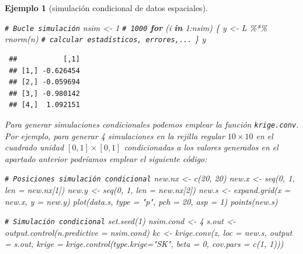\documentclass[
  10pt,
]{book}
\newenvironment{Shaded}{\begin{snugshade}}{\end{snugshade}}
\newcommand{\AttributeTok}[1]{\textcolor[rgb]{0.77,0.63,0.00}{#1}}
\newcommand{\CommentTok}[1]{\textcolor[rgb]{0.56,0.35,0.01}{\textit{#1}}}
\newcommand{\ControlFlowTok}[1]{\textcolor[rgb]{0.13,0.29,0.53}{\textbf{#1}}}
\newcommand{\DecValTok}[1]{\textcolor[rgb]{0.00,0.00,0.81}{#1}}
\newcommand{\FunctionTok}[1]{\textcolor[rgb]{0.00,0.00,0.00}{#1}}
\newcommand{\NormalTok}[1]{#1}
\newcommand{\OtherTok}[1]{\textcolor[rgb]{0.56,0.35,0.01}{#1}}
\newcommand{\SpecialCharTok}[1]{\textcolor[rgb]{0.00,0.00,0.00}{#1}}
\newcommand{\StringTok}[1]{\textcolor[rgb]{0.31,0.60,0.02}{#1}}
\theoremstyle{break}
\newtheorem{example}{Ejemplo}[chapter]
\theoremstyle{nonumberplain}
\renewcommand{\CommentTok}[1]{\textcolor[rgb]{0.41,0.41,0.41}{\texttt{#1}}}
\begin{document}
\begin{example}[simulación condicional de datos espaciales]
\begin{Shaded}
\begin{Highlighting}[]
\CommentTok{\# Bucle simulación}
\NormalTok{nsim }\OtherTok{\textless{}{-}} \DecValTok{1} \CommentTok{\# 1000}
\ControlFlowTok{for}\NormalTok{ (i }\ControlFlowTok{in} \DecValTok{1}\SpecialCharTok{:}\NormalTok{nsim) \{}
\NormalTok{  y }\OtherTok{\textless{}{-}}\NormalTok{ L }\SpecialCharTok{\%*\%} \FunctionTok{rnorm}\NormalTok{(n)}
  \CommentTok{\# calcular estadísticos, errores,...}
\NormalTok{\}}
\NormalTok{y}
\end{Highlighting}
\end{Shaded}

\begin{verbatim}
 ##           [,1]
 ## [1,] -0.626454
 ## [2,] -0.059694
 ## [3,] -0.980142
 ## [4,]  1.092151
\end{verbatim}

Para generar simulaciones condicionales podemos emplear la función \texttt{krige.conv}.
Por ejemplo, para generar 4 simulaciones en la rejilla regular \(10\times10\) en el cuadrado unidad \([0,1] \times [0,1]\) condicionadas a los valores generados en el apartado anterior podríamos emplear el siguiente código:

\begin{Shaded}
\begin{Highlighting}[]
\CommentTok{\# Posiciones simulación condicional}
\NormalTok{new.nx }\OtherTok{\textless{}{-}} \FunctionTok{c}\NormalTok{(}\DecValTok{20}\NormalTok{, }\DecValTok{20}\NormalTok{)}
\NormalTok{new.x }\OtherTok{\textless{}{-}} \FunctionTok{seq}\NormalTok{(}\DecValTok{0}\NormalTok{, }\DecValTok{1}\NormalTok{, }\AttributeTok{len =}\NormalTok{ new.nx[}\DecValTok{1}\NormalTok{])}
\NormalTok{new.y }\OtherTok{\textless{}{-}} \FunctionTok{seq}\NormalTok{(}\DecValTok{0}\NormalTok{, }\DecValTok{1}\NormalTok{, }\AttributeTok{len =}\NormalTok{ new.nx[}\DecValTok{2}\NormalTok{])}
\NormalTok{new.s }\OtherTok{\textless{}{-}} \FunctionTok{expand.grid}\NormalTok{(}\AttributeTok{x =}\NormalTok{ new.x, }\AttributeTok{y =}\NormalTok{ new.y)}
\FunctionTok{plot}\NormalTok{(data.s, }\AttributeTok{type =} \StringTok{"p"}\NormalTok{, }\AttributeTok{pch =} \DecValTok{20}\NormalTok{, }\AttributeTok{asp =} \DecValTok{1}\NormalTok{)}
\FunctionTok{points}\NormalTok{(new.s)}

\CommentTok{\# Simulación condicional}
\FunctionTok{set.seed}\NormalTok{(}\DecValTok{1}\NormalTok{)}
\NormalTok{nsim.cond }\OtherTok{\textless{}{-}} \DecValTok{4}
\NormalTok{s.out }\OtherTok{\textless{}{-}} \FunctionTok{output.control}\NormalTok{(}\AttributeTok{n.predictive =}\NormalTok{ nsim.cond)}
\NormalTok{kc }\OtherTok{\textless{}{-}} \FunctionTok{krige.conv}\NormalTok{(z, }\AttributeTok{loc =}\NormalTok{ new.s, }\AttributeTok{output =}\NormalTok{ s.out,}
            \AttributeTok{krige =} \FunctionTok{krige.control}\NormalTok{(}\AttributeTok{type.krige=}\StringTok{"SK"}\NormalTok{, }\AttributeTok{beta =} \DecValTok{0}\NormalTok{, }\AttributeTok{cov.pars =} \FunctionTok{c}\NormalTok{(}\DecValTok{1}\NormalTok{, }\DecValTok{1}\NormalTok{)))}
\end{Highlighting}
\end{Shaded}


\end{example}
\end{document}
